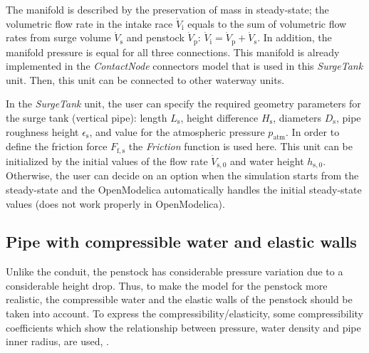 \documentclass[%
]{USN-PhD}
\begin{document}
The manifold is described by the preservation of mass in steady-state; the volumetric flow rate in the intake race $\dot{V}_\mathrm{i}$ equals to the sum of volumetric flow rates from surge volume $\dot{V}_\mathrm{s}$ and penstock $\dot{V}_\mathrm{p}$: $\dot{V}_\mathrm{i}=\dot{V}_\mathrm{p}+\dot{V}_\mathrm{s}$. In addition, the manifold pressure is equal for all three connections. This manifold is already implemented in the \emph{ContactNode} connectors model that is used in this \emph{SurgeTank} unit. Then, this unit can be connected to other waterway units.

In the \emph{SurgeTank} unit, the user can specify the required geometry parameters for the surge tank (vertical pipe): length $L_\mathrm{s}$, height difference $H_\mathrm{s}$, diameters $D_\mathrm{s}$, pipe roughness height $\epsilon_\mathrm{s}$, and value for the atmospheric pressure $p_\mathrm{atm}$. In order to define the friction force $F_\mathrm{f,s}$ the \emph{Friction} function is used here. This unit can be initialized by the initial values of the flow rate $\dot{V}_\mathrm{s,0}$ and water height $h_\mathrm{s,0}$. Otherwise, the user can decide on an option when the simulation starts from the steady-state and the OpenModelica automatically handles the initial steady-state values (does not work properly in OpenModelica).

\subsection{Pipe with compressible water and elastic walls}

Unlike the conduit, the penstock has considerable pressure variation due to a considerable height drop. Thus, to make the model for the penstock more realistic, the compressible water and the elastic walls of the penstock should be taken into account. To express the compressibility/elasticity, some compressibility coefficients which show the relationship between pressure, water density and pipe inner radius, are used, \cite{Sha:11,Vyt:17}.
\end{document}
